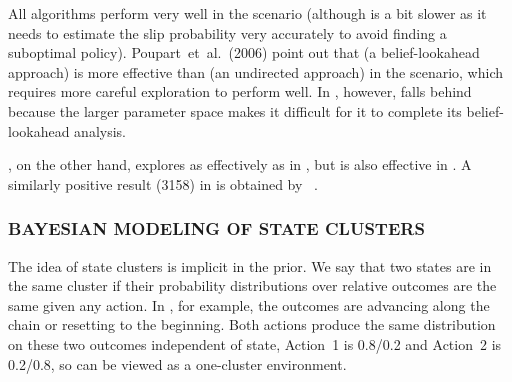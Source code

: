 \begin{table}
\caption{Cumulative reward in ~\cite{asmuth09}}
\label{t:chain}
\end{table}

All algorithms perform very well in the  scenario (although
 is a bit slower as it needs to estimate the slip probability
very accurately to avoid finding a suboptimal policy).
Poupart~et~al.~(2006) point out that  (a belief-lookahead
approach)  is more effective than  (an undirected approach) in
the  scenario, which requires more careful exploration to perform
well.  In , however,  falls behind because the larger
parameter space makes it difficult for it to complete its
belief-lookahead analysis. 

, on the other hand, explores as effectively as  in ,
but is also effective in .  A similarly positive result (3158) in  is
obtained by ~\cite{strens00}. 

\subsubsection{BAYESIAN MODELING OF STATE CLUSTERS}
\label{s:cluster}

The idea of state clusters is implicit in the  prior.
We say that two states are in the same cluster if
their probability distributions over relative outcomes are the same
given any action.  In , for example, the outcomes are advancing along the
chain or resetting to the beginning.  Both actions produce the
same distribution on these two outcomes independent of state, Action~1
is 0.8/0.2 and Action~2 is 0.2/0.8, so  can be viewed as a
one-cluster environment.

